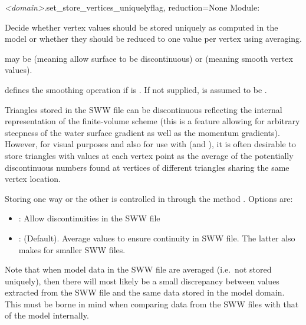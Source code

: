 \documentclass{manual}
\begin{document}
\begin{methoddesc}{\emph{<domain>}.set_store_vertices_uniquely}{flag, reduction=None}
Module: 

Decide whether vertex values should be stored uniquely as
computed in the model or whether they should be reduced to one
value per vertex using averaging.

 may be  (meaning allow surface to be discontinuous) or  (meaning smooth vertex values).

 defines the smoothing operation if  is .  If not
supplied,  is assumed to be .

Triangles stored in the SWW file can be discontinuous reflecting
the internal representation of the finite-volume scheme
(this is a feature allowing for arbitrary steepness of the water surface gradient
as well as the momentum gradients).
However, for visual purposes and also for use with 
(and ), it is often desirable to store triangles
with values at each vertex point as the average of the potentially
discontinuous numbers found at vertices of different triangles sharing the
same vertex location.

Storing one way or the other is controlled in \anuga through the method
. Options are:
\begin{itemize}
  \item {}: Allow discontinuities in the SWW file
  \item {}: (Default).
  Average values
  to ensure continuity in SWW file. The latter also makes for smaller
  SWW files.
\end{itemize}

Note that when model data in the SWW file are averaged (i.e.\ not stored uniquely), 
then there will most likely be a small discrepancy between values extracted from the SWW 
file and the same data stored in the model domain. This must be borne in mind when comparing
data from the SWW files with that of the model internally. 
\end{methoddesc}
\end{document}
